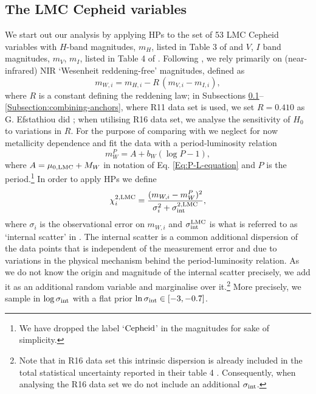 \subsection{The LMC Cepheid variables}
\label{Subsection:LMC}

We start out our analysis by applying HPs to the set of 
53 LMC Cepheid variables with $H$-band magnitudes, $m_H$, listed in Table 3 of  \cite{2004AJ:128.2239P} and $V$, $I$ band magnitudes, $m_V$, $m_I$, listed in Table 4 of \cite{2002ApJS:142:71S}. Following \cite{Riess:2016jrr}, we rely primarily on (near-infrared) NIR `Wesenheit reddening-free' magnitudes, defined as 
\begin{equation}\label{Eq:Wesenheit-reddening-free}
m_{W,i} = m_{H,i} - R\, (m_{V,i} - m_{I,i}),
\end{equation}
where $R$ is a constant defining the reddening law; in Subsections \ref{Subsection:LMC}--\ref{Subsection:combining-anchors}, where R11 data set is used, we set $R=0.410$ as G. Efstathiou did \cite{Efstathiou:2013via}; when utilising R16 data set, we analyse the sensitivity of $H_0$ to variations in $R$. For the purpose of comparing with \cite{Efstathiou:2013via} we neglect for now metallicity dependence and fit the data with a period-luminosity relation
\begin{equation}\label{Eq:P-L-LMC}
m^P_W = A + b_W (\log P - 1),
\end{equation}
where $A = \mu_{0,\mathrm{LMC}} + M_W$ in notation of Eq. \eqref{Eq:P-L-equation} and $P$ is the period.\footnote{We have dropped the label `$\mathrm{Cepheid}$' in the magnitudes for sake of simplicity.} In order to apply HPs we define 
\begin{equation}\label{Eq:chi2-LMC}
\chi^{2,\mathrm{LMC}}_{i} = \frac{(m_{W,i} - m^P_{W})^2}{\sigma_i^2 + \sigma^{2,\mathrm{LMC}}_{\mathrm{int}}},
\end{equation}
where $\sigma_i$ is the observational error on $m_{W,i}$ and $\sigma_{\mathrm{int}}^{\mathrm{LMC}}$ is what is referred to as `internal scatter' in \cite{Efstathiou:2013via}. The internal scatter is a common additional dispersion of the data points that is independent of the measurement error and due to variations in the physical mechanism behind the period-luminosity relation. As we do not know the origin and magnitude of the internal scatter precisely, we add it as an additional random variable and marginalise over it.\footnote{Note that in R16 data set this intrinsic dispersion is already included in the total statistical uncertainty reported in their table 4 \cite{Riess:2016jrr}. Consequently, when analysing the R16 data set we do not include an additional $\sigma_{\mathrm{int}}$.} More precisely, we sample in $\log \sigma_{\mathrm{int}}$ with a flat prior $\ln \sigma_{\mathrm{int}} \in [-3,-0.7]$.
